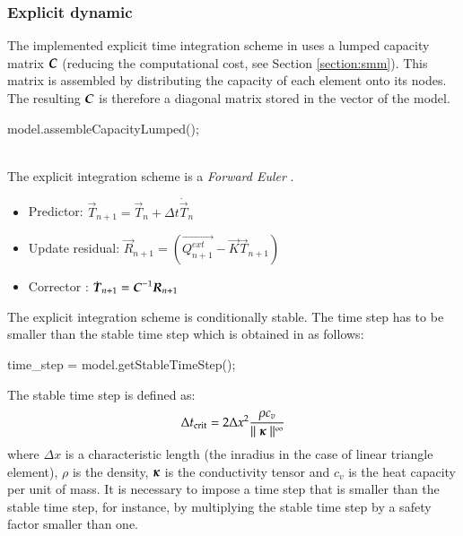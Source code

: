 \subsubsection{Explicit dynamic}

The implemented explicit  time integration scheme in \akantu  uses a lumped capacity
matrix $\boldsymbol{C}$ (reducing the computational  cost, see Section \ref{section:smm}). 
This matrix is assembled by
distributing the capacity of each element onto its nodes. The resulting $\boldsymbol{C}$ is
therefore a diagonal matrix stored in the  vector of the model.

\begin{cpp}
  model.assembleCapacityLumped();
\end{cpp}

 \\

The explicit integration scheme is a  {\it Forward Euler} 
\cite{curnier92a}.

\begin{itemize}
\item Predictor: $\vec{T}_{n+1} = \vec{T}_{n} + \Delta t \dot{\vec{T}}_{n}$
\item Update residual: $\vec{R}_{n+1} = \left( \vec{Q^{ext}_{n+1}} - \vec{K}\vec{T}_{n+1} \right)$
\item Corrector : $\dot{\boldsymbol{T}}_{n+1} = \boldsymbol{C}^{-1} \boldsymbol{R}_{n+1}$
\end{itemize}

The explicit integration scheme is conditionally stable. The time step has to be
smaller than the stable time step which is obtained in \akantu as follows:

\begin{cpp}
  time_step = model.getStableTimeStep();
\end{cpp}

The stable time step is defined as:
\begin{equation}\label{eqn:smm:explicit:stabletime}
  \Delta t_{{\mathrm{crit}}} = 2 \Delta x^2 \frac{\rho c_v}{\mid\mid \boldsymbol{\kappa} \mid\mid^\infty}
\end{equation}
where $\Delta  x$ is a  characteristic length (\eg  the inradius in the  case of
linear triangle  element), $\rho$ is the density, $\boldsymbol{\kappa}$ is the conductivity tensor
and $c_v$ is the heat capacity per unit of mass. It is
necessary to impose a  time step that is smaller than the  stable time step, for
instance, by  multiplying the stable time  step by a safety  factor smaller than
one.

